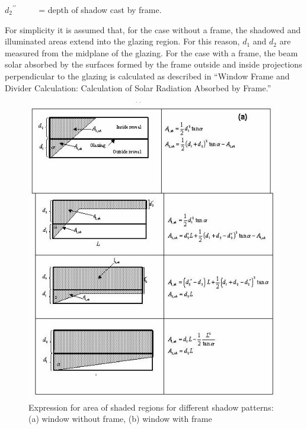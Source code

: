 \({d_2}^{\prime \prime }\) ~~~~ = depth of shadow cast by frame.

For simplicity it is assumed that, for the case without a frame, the shadowed and illuminated areas extend into the glazing region. For this reason, \({d_1}\) and \({d_2}\) are measured from the midplane of the glazing. For the case with a frame, the beam solar absorbed by the surfaces formed by the frame outside and inside projections perpendicular to the glazing is calculated as described in ``Window Frame and Divider Calculation: Calculation of Solar Radiation Absorbed by Frame.''

\begin{figure}[htbp]
\centering
\includegraphics{media/image1605.png}
\caption{Expression for area of shaded regions for different shadow patterns: (a) window without frame, (b) window with frame}
\end{figure}

